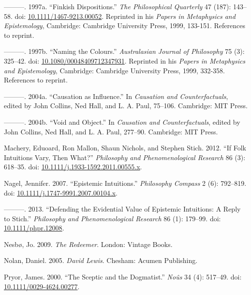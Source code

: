 \documentclass[
  11pt,
  letterpaper,
  DIV=11,
  numbers=noendperiod,
  twoside]{scrartcl}
\newlength{\cslhangindent}
\newenvironment{CSLReferences}[2] %
 {\begin{list}{}{%
  \setlength{\itemindent}{0pt}
  \setlength{\leftmargin}{0pt}
  \setlength{\parsep}{0pt}
  \ifodd #1
   \setlength{\leftmargin}{\cslhangindent}
   \setlength{\itemindent}{-1\cslhangindent}
  \fi
  \setlength{\itemsep}{#2\baselineskip}}}
 {\end{list}}
\begin{document}
\begin{CSLReferences}{1}{0}
---------. 1997a. {``Finkish Dispositions.''} \emph{The Philosophical
Quarterly} 47 (187): 143--58. doi:
\href{https://doi.org/10.1111/1467-9213.00052}{10.1111/1467-9213.00052}.
Reprinted in his \emph{Papers in Metaphysics and Epistemology},
Cambridge: Cambridge University Press, 1999, 133-151. References to
reprint.

---------. 1997b. {``Naming the Colours.''} \emph{Australasian Journal
of Philosophy} 75 (3): 325--42. doi:
\href{https://doi.org/10.1080/00048409712347931}{10.1080/00048409712347931}.
Reprinted in his \emph{Papers in Metaphysics and Epistemology},
Cambridge: Cambridge University Press, 1999, 332-358. References to
reprint.

---------. 2004a. {``Causation as Influence.''} In \emph{Causation and
Counterfactuals}, edited by John Collins, Ned Hall, and L. A. Paul,
75--106. Cambridge: {MIT} Press.

---------. 2004b. {``Void and Object.''} In \emph{Causation and
Counterfactuals}, edited by John Collins, Ned Hall, and L. A. Paul,
277--90. Cambridge: {MIT} Press.

Machery, Eduoard, Ron Mallon, Shaun Nichols, and Stephen Stich. 2012.
{``If Folk Intuitions Vary, Then What?''} \emph{Philosophy and
Phenomenological Research} 86 (3): 618--35. doi:
\href{https://doi.org/10.1111/j.1933-1592.2011.00555.x}{10.1111/j.1933-1592.2011.00555.x}.

Nagel, Jennifer. 2007. {``Epistemic Intuitions.''} \emph{Philosophy
Compass} 2 (6): 792--819. doi:
\href{https://doi.org/10.1111/j.1747-9991.2007.00104.x}{10.1111/j.1747-9991.2007.00104.x}.

---------. 2013. {``Defending the Evidential Value of Epistemic
Intuitions: A Reply to Stich.''} \emph{{P}hilosophy and
{P}henomenological {R}esearch} 86 (1): 179--99. doi:
\href{https://doi.org/10.1111/phpr.12008}{10.1111/phpr.12008}.

Nesbø, Jo. 2009. \emph{The Redeemer}. London: Vintage Books.

Nolan, Daniel. 2005. \emph{David Lewis}. Chesham: Acumen Publishing.

Pryor, James. 2000. {``The Sceptic and the Dogmatist.''} \emph{No{û}s}
34 (4): 517--49. doi:
\href{https://doi.org/10.1111/0029-4624.00277}{10.1111/0029-4624.00277}.


\end{CSLReferences}
\end{document}
